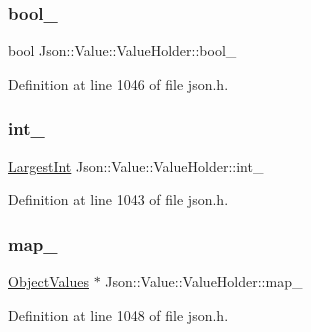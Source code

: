 \subsubsection{\texorpdfstring{bool\+\_\+}{bool\_}}
{\footnotesize\ttfamily bool Json\+::\+Value\+::\+Value\+Holder\+::bool\+\_\+}



Definition at line 1046 of file json.\+h.

\hypertarget{union_json_1_1_value_1_1_value_holder_adbfb384301298844ed955ba5cf6015a0}{}\label{union_json_1_1_value_1_1_value_holder_adbfb384301298844ed955ba5cf6015a0} 
\subsubsection{\texorpdfstring{int\+\_\+}{int\_}}
{\footnotesize\ttfamily \hyperlink{class_json_1_1_value_a1cbb82642ed05109b9833e49f042ece7}{Largest\+Int} Json\+::\+Value\+::\+Value\+Holder\+::int\+\_\+}



Definition at line 1043 of file json.\+h.

\hypertarget{union_json_1_1_value_1_1_value_holder_a37a6355da01e4dec1fabba8c1520f297}{}\label{union_json_1_1_value_1_1_value_holder_a37a6355da01e4dec1fabba8c1520f297} 
\subsubsection{\texorpdfstring{map\+\_\+}{map\_}}
{\footnotesize\ttfamily \hyperlink{class_json_1_1_value_a08b6c80c3af7071d908dabf044de5388}{Object\+Values} $\ast$ Json\+::\+Value\+::\+Value\+Holder\+::map\+\_\+}



Definition at line 1048 of file json.\+h.

\hypertarget{union_json_1_1_value_1_1_value_holder_af0c5ca724e5fe3a15db773d750e2351e}{}\label{union_json_1_1_value_1_1_value_holder_af0c5ca724e5fe3a15db773d750e2351e} 

